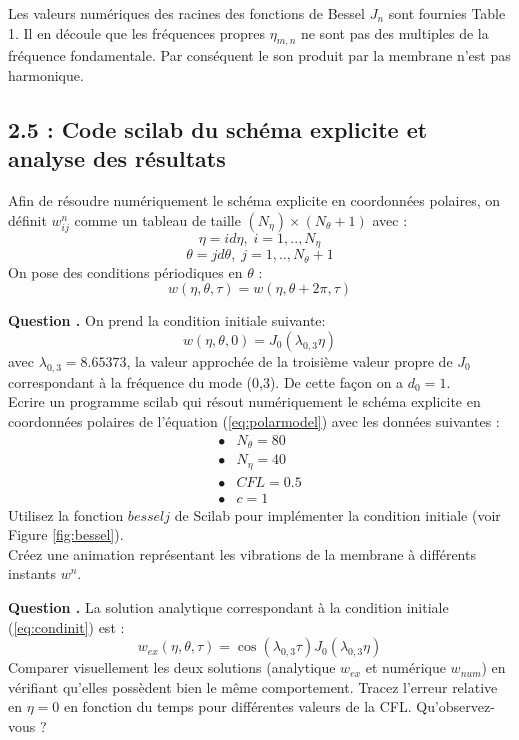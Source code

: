 \documentclass[a4,12pt]{article}
\newcounter{Nbquestion}
\newcommand*\question{%
  \stepcounter{Nbquestion}%
  \textbf{Question \theNbquestion. }}
\begin{document}
			Les valeurs numériques des racines des fonctions de Bessel $J_n$ sont fournies Table 1. Il en découle que les fréquences propres $\eta_{m,n}$ ne sont pas des multiples de la fréquence fondamentale. Par conséquent le son produit par la membrane n'est pas harmonique.

			\newpage 

			\subsection*{2.5 : Code scilab du schéma explicite et analyse des résultats}

			Afin de résoudre numériquement le schéma explicite en coordonnées polaires, on définit $w_{ij}^n$ comme un tableau de taille $(N_\eta)\times(N_\theta+1)$ avec :
			\[
			  \eta=id\eta ,\;i=1,..,N_\eta
			\]
			\[
			  \theta=jd\theta ,\;j=1,..,N_\theta+1
			\]
			On pose des conditions périodiques en $\theta$ :
			\[
			  w(\eta,\theta,\tau)=w(\eta,\theta+2\pi,\tau)
			\]


			\question On prend la condition initiale suivante:
			\begin{equation}
			  w(\eta,\theta,0)=J_0(\lambda_{0,3}\eta)
			  \label{eq:condinit}
			\end{equation}
			avec $\lambda_{0,3}=8.65373$, la valeur approchée de la troisième valeur propre de $J_0$ correspondant à la fréquence du mode (0,3). De cette façon on a $d_0=1$.\\

			Ecrire un programme scilab qui résout numériquement le schéma explicite en coordonnées polaires de l'équation (\ref{eq:polarmodel}) avec les données suivantes : 
			\[
			  \begin{array}{ll}
			    \bullet & N_\theta=80 \\ 
			    \bullet & N_\eta=40 \\ 
			    \bullet & CFL=0.5 \\ 
			    \bullet & c=1
			  \end{array}
			\]
			Utilisez la fonction $besselj$ de Scilab pour implémenter la condition initiale (voir Figure \ref{fig:bessel}).\\
			Créez une animation représentant les vibrations de la membrane à différents instants $w^n$.



			\question La solution analytique correspondant à la condition initiale (\ref{eq:condinit}) est :
			\[
			  w_{ex}(\eta,\theta,\tau)=\cos(\lambda_{0,3} \tau)J_0(\lambda_{0,3}\eta)
			\]
			Comparer visuellement les deux solutions (analytique $w_{ex}$ et numérique $w_{num}$) en vérifiant qu'elles possèdent bien le même comportement.
			Tracez l'erreur relative en $\eta=0$ en fonction du temps pour   différentes valeurs de la CFL. 
			Qu'observez-vous ?
\end{document}
